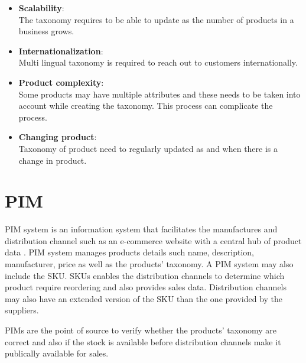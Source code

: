 \begin{enumerate}[label=\textbf{Q\arabic*:}]
    \begin{itemize}
        \item \textbf{Scalability}:\\ The taxonomy requires to be able to update as the number of products in a business grows.
        \item \textbf{Internationalization}:\\ Multi lingual taxonomy is required to reach out to customers internationally. 
        \item \textbf{Product complexity}:\\  Some products may have multiple attributes and these needs to be taken into account while creating the taxonomy. This process can complicate the process.
        \item \textbf{Changing product}:\\ Taxonomy of product need to regularly updated as and when there is a change in product. 
    \end{itemize}

\end{enumerate}

\section{\acf{PIM}}
\acl{PIM} system is an information system that facilitates the manufactures and distribution channel such as an e-commerce website with a central hub of product data \parencite{iceclog}. \acs{PIM} system manages products details such name, description, manufacturer, price as well as the products' taxonomy. A PIM system may also include the \acf{SKU}. \acsp{SKU} enables the distribution channels to determine which product require reordering and also provides sales data. Distribution channels may also have an extended version of the \acs{SKU} than the one provided by the suppliers.

\acsp{PIM} are the point of source to verify whether the products' taxonomy are correct and also if the stock is available before distribution channels make it publically available for sales.


   
